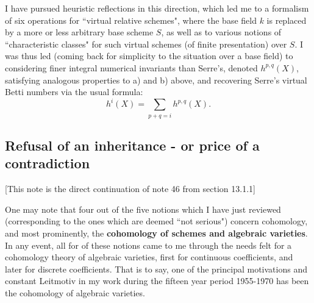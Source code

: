 I have pursued heuristic reflections in this direction, which led me to a formalism of six operations for ``virtual relative schemes", where the base field $k$ is replaced by a more or less arbitrary base scheme $S$, as well as to various notions of ``characteristic classes" for such virtual schemes (of finite presentation) over $S$. I was thus led (coming back for simplicity to the situation over a base field) to considering finer integral numerical invariants than Serre's, denoted $h^{p,q}(X)$, satisfying analogous properties to a) and b) above, and recovering Serre's virtual Betti numbers via the usual formula:
$$ h^i(X) = \sum_{p+q = i} h^{p,q}(X). $$

\subsection{Refusal of an inheritance - or price of a contradiction}

\label{note:47} [This note is the direct continuation of note 46 from section 13.1.1]

One may note that four out of the five notions which I have just reviewed (corresponding to the ones which are deemed ``not serious") concern cohomology, and most prominently, the \textbf{cohomology of schemes and algebraic varieties}. In any event, all for of these notions came to me through the needs felt for a cohomology theory of algebraic varieties, first for continuous coefficients, and later for discrete coefficients. That is to say, one of the principal motivations and constant Leitmotiv in my work during the fifteen year period 1955-1970 has been the cohomology of algebraic varieties.

